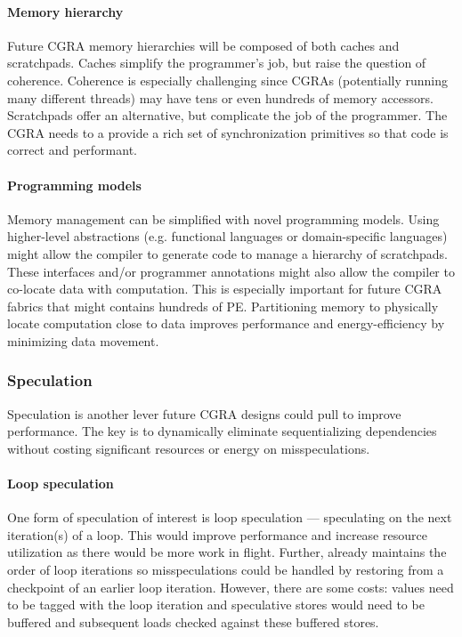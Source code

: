 \paragraph{Memory hierarchy}
Future CGRA memory hierarchies will be composed of both caches and scratchpads.
% 
Caches simplify the programmer's job, but raise the question of coherence.
% 
Coherence is especially challenging since CGRAs (potentially running many different threads) may have tens or even hundreds of memory accessors.
% 
Scratchpads offer an alternative, but complicate the job of the programmer.
% 
The CGRA needs to a provide a rich set of synchronization primitives so that code is correct and performant.

\paragraph{Programming models}
Memory management can be simplified with novel programming models.
% 
Using higher-level abstractions (e.g. functional languages or domain-specific languages) might allow the compiler to generate code to manage a hierarchy of scratchpads.
%
These interfaces and/or programmer annotations might also allow the compiler to co-locate data with computation.
% 
This is especially important for future CGRA fabrics that might contains hundreds of PE.
% 
Partitioning memory to physically locate computation close to data improves performance and energy-efficiency by minimizing data movement.

\subsubsection{Speculation}
Speculation is another lever future CGRA designs could pull to improve performance.
%
The key is to dynamically eliminate sequentializing dependencies without costing significant resources or energy on misspeculations.

\paragraph{Loop speculation}
One form of speculation of interest is loop speculation --- speculating on the next iteration(s) of a loop.
% 
This would improve performance and increase resource utilization as there would be more work in flight.
% 
Further, \riptide already maintains the order of loop iterations so misspeculations could be handled by restoring from a checkpoint of an earlier loop iteration.
% 
However, there are some costs: values need to be tagged with the loop iteration and speculative stores would need to be buffered and subsequent loads checked against these buffered stores.

